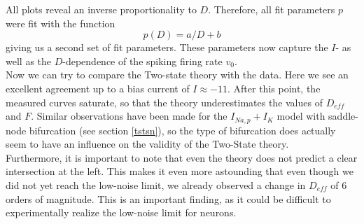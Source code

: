 \documentclass[12pt,a4paper]{article}
\begin{document}
All plots reveal an inverse proportionality to $D$. Therefore, all fit parameters $p$ were fit with the function
\begin{equation}
p(D)=a/D+b
\end{equation}
giving us a second set of fit parameters. These parameters now capture the $I$- as well as the $D$-dependence of the spiking firing rate $v_0$.
\\
Now we can try to compare the Two-state theory with the data. Here we see an excellent agreement up to a bias current of $I\approx-11$. After this point, the measured curves saturate, so that the theory underestimates the values of $D_{eff}$ and $F$. Similar observations have been made for the $I_{Na,p}+I_K$ model with saddle-node bifurcation (see section \ref{tstsn}), so the type of bifurcation does actually seem to have an influence on the validity of the Two-State theory.\\
Furthermore, it is important to note that even the theory does not predict a clear intersection at the left. This makes it even more astounding that even though we did not yet reach the low-noise limit, we already observed a change in $D_{eff}$ of 6 orders of magnitude. This is an important finding, as it could be difficult to experimentally realize the low-noise limit for neurons.
\end{document}
